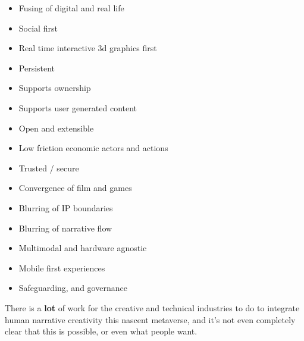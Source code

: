 \begin{itemize}
\item Fusing of digital and real life
\item Social first
\item Real time interactive 3d graphics first
\item Persistent
\item Supports ownership
\item Supports user generated content \cite{ondrejka2004escaping}
\item Open and extensible
\item Low friction economic actors and actions
\item Trusted / secure
\item Convergence of film and games
\item Blurring of IP boundaries
\item Blurring of narrative flow
\item Multimodal and hardware agnostic
\item Mobile first experiences
\item Safeguarding, and governance
\end{itemize}
There is a \textbf{lot} of work for the creative and technical industries to do to integrate human narrative creativity this nascent metaverse, and it's not even completely clear that this is possible, or even what people want.
